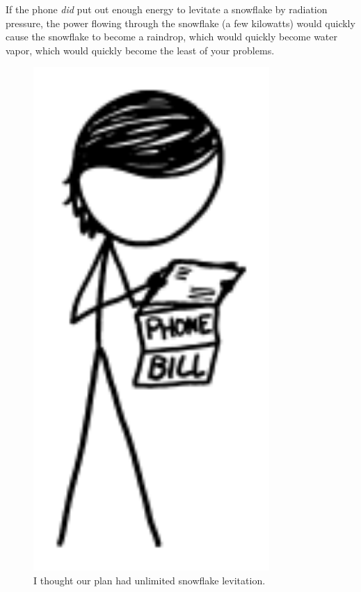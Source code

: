 {{If the phone \emph{did} put out enough energy to levitate a snowflake by radiation pressure, the power flowing through the snowflake (a few kilowatts) would quickly cause the snowflake to become a raindrop, which would quickly become water vapor, which would quickly become the least of your problems.}

\begin{figure}[!htbp]
\centering
\includegraphics[scale=0.5, max width=0.8\textwidth]{imgs/a/87/radar_phonebill.png}
\caption{I thought our plan had unlimited snowflake levitation.}
\end{figure}

}
